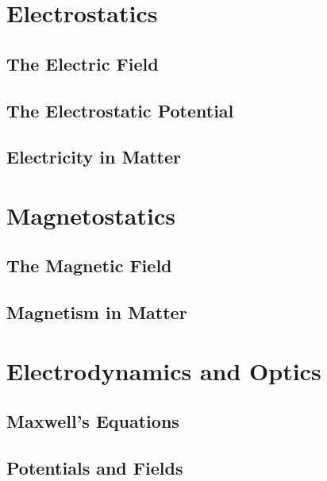 \documentclass{book}
\begin{document}


\tableofcontents
\part{Electrostatics}
\chapter{The Electric Field}
%

\chapter{The Electrostatic Potential}

\chapter{Electricity in Matter}

\part{Magnetostatics}
\chapter{The Magnetic Field}

\chapter{Magnetism in Matter}

\part{Electrodynamics and Optics}
\chapter{Maxwell's Equations}

\chapter{Potentials and Fields}

\end{document}
